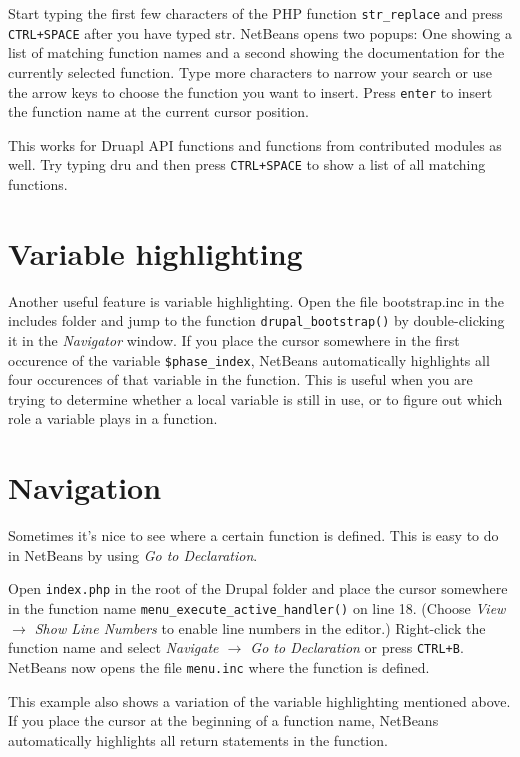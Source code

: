 \documentclass[draft,ebook,10pt,twoside,openright]{memoir}
\begin{document}
Start typing the first few characters of the PHP function \verb!str_replace! and press \verb!CTRL+SPACE! after you have typed str. NetBeans opens two popups: One showing a list of matching function names and a second showing the documentation for the currently selected function. Type more characters to narrow your search or use the arrow keys to choose the function you want to insert. Press \verb!enter! to insert the function name at the current cursor position.

This works for Druapl API functions and functions from contributed modules as well. Try typing dru and then press \verb!CTRL+SPACE! to show a list of all matching functions.

\section{Variable highlighting}

Another useful feature is variable highlighting. Open the file bootstrap.inc in the includes folder and jump to the function \verb!drupal_bootstrap()! by double-clicking it in the \emph{Navigator} window. If you place the cursor somewhere in the first occurence of the variable \verb!$phase_index!, NetBeans automatically highlights all four occurences of that variable in the function. This is useful when you are trying to determine whether a local variable is still in use, or to figure out which role a variable plays in a function.

\section{Navigation}

Sometimes it’s nice to see where a certain function is defined. This is easy to do in NetBeans by using \emph{Go to Declaration}.

Open \verb!index.php! in the root of the Drupal folder and place the cursor somewhere in the function name \verb!menu_execute_active_handler()! on line 18. (Choose \emph{View $\rightarrow$ Show Line Numbers} to enable line numbers in the editor.) Right-click the function name and select \emph{Navigate $\rightarrow$ Go to Declaration} or press \verb!CTRL+B!. NetBeans now opens the file \verb!menu.inc! where the function is defined.

This example also shows a variation of the variable highlighting mentioned above. If you place the cursor at the beginning of a function name, NetBeans automatically highlights all return statements in the function.
\end{document}
